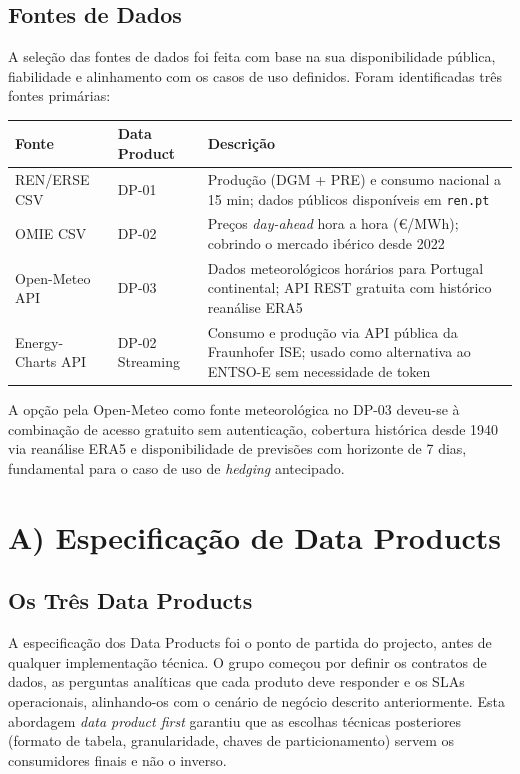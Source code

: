 \documentclass[11pt,a4paper]{article}
\begin{document}
\subsection{Fontes de Dados}

A seleção das fontes de dados foi feita com base na sua disponibilidade pública, fiabilidade e alinhamento com os casos de uso definidos. Foram identificadas três fontes primárias:

\begin{table}[htbp]
\centering
\scriptsize
\begin{tabularx}{\linewidth}{p{2.1cm}p{4.0cm}>{\raggedright\arraybackslash}X}
\toprule
\textbf{Fonte} & \textbf{Data Product} & \textbf{Descrição} \\
\midrule
REN/ERSE CSV & DP-01 & Produção (DGM + PRE) e consumo nacional a 15 min; dados públicos disponíveis em \texttt{ren.pt} \\
OMIE CSV & DP-02 & Preços \textit{day-ahead} hora a hora (€/MWh); cobrindo o mercado ibérico desde 2022 \\
Open-Meteo API & DP-03 & Dados meteorológicos horários para Portugal continental; API REST gratuita com histórico reanálise ERA5 \\
Energy-Charts API & DP-02 Streaming & Consumo e produção via API pública da Fraunhofer ISE; usado como alternativa ao ENTSO-E sem necessidade de token \\
\bottomrule
\end{tabularx}
\end{table}

A opção pela Open-Meteo como fonte meteorológica no DP-03 deveu-se à combinação de acesso gratuito sem autenticação, cobertura histórica desde 1940 via reanálise ERA5 e disponibilidade de previsões com horizonte de 7 dias, fundamental para o caso de uso de \textit{hedging} antecipado.

\section{A) Especificação de Data Products}

\subsection{Os Três Data Products}

A especificação dos Data Products foi o ponto de partida do projecto, antes de qualquer implementação técnica. O grupo começou por definir os contratos de dados, as perguntas analíticas que cada produto deve responder e os SLAs operacionais, alinhando-os com o cenário de negócio descrito anteriormente. Esta abordagem \textit{data product first} garantiu que as escolhas técnicas posteriores (formato de tabela, granularidade, chaves de particionamento) servem os consumidores finais e não o inverso.
\end{document}
